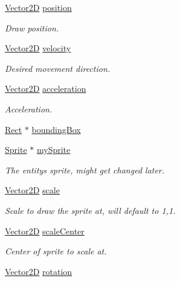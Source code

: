 \begin{DoxyCompactItemize}
\item 
\hyperlink{struct_vector2_d}{Vector2D} \hyperlink{structentity__s_a2dc349a13930beaf26472e0d04d9563e}{position}
\begin{DoxyCompactList}\small\item\em Draw position. \end{DoxyCompactList}\item 
\hyperlink{struct_vector2_d}{Vector2D} \hyperlink{structentity__s_a5b7790a4c9666f321ce2228f1b8bd118}{velocity}
\begin{DoxyCompactList}\small\item\em Desired movement direction. \end{DoxyCompactList}\item 
\hyperlink{struct_vector2_d}{Vector2D} \hyperlink{structentity__s_af4d83cb71edc9f387519fb3c7669f9bd}{acceleration}
\begin{DoxyCompactList}\small\item\em Acceleration. \end{DoxyCompactList}\item 
\hyperlink{shape_8h_a44e2d24ab2a21b90d03880cab9cc6d16}{Rect} $\ast$ \hyperlink{structentity__s_a3d49780e142d5f067cdd71be48ad284d}{bounding\+Box}
\item 
\hyperlink{gf2d__sprite_8h_a85b5a622f08c587d1f33fd504a24416e}{Sprite} $\ast$ \hyperlink{structentity__s_a09530f21303b5dbd659855de69a51e0c}{my\+Sprite}
\begin{DoxyCompactList}\small\item\em The entity\textquotesingle{}s sprite, might get changed later. \end{DoxyCompactList}\item 
\hyperlink{struct_vector2_d}{Vector2D} \hyperlink{structentity__s_a1b187f4d1f81894380925e9de933801a}{scale}
\begin{DoxyCompactList}\small\item\em Scale to draw the sprite at, will default to 1,1. \end{DoxyCompactList}\item 
\hyperlink{struct_vector2_d}{Vector2D} \hyperlink{structentity__s_a8ff0fe80de1fcc51fee6f1d766e9de8b}{scale\+Center}
\begin{DoxyCompactList}\small\item\em Center of sprite to scale at. \end{DoxyCompactList}\item 
\hyperlink{struct_vector2_d}{Vector2D} \hyperlink{structentity__s_ac4e0ffa54c436c5dad6ca9481266f9ed}{rotation}

\end{DoxyCompactItemize}
